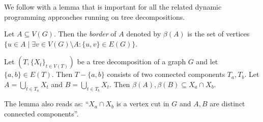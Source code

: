 We follow with a lemma that is important for all the related
dynamic programming approaches running on tree decompositions.
%
\begin{definition}
	Let \( A \subseteq V(G) \). Then the \emph{border} of \( A \) denoted by \( \beta(A) \)
	is the set of vertices
	\( \{u \in A \mid \exists v \in V(G) \setminus A : \{u, v\} \in E(G) \} \).
\end{definition}
%
\begin{lemma}
	Let \( (T, {\{X_t\}}_{t \in V ( T )}) \)
	be a tree decomposition of a graph \( G \)
	and let \( \{a, b\} \in E(T) \).
	Then \( T - \{a, b\} \) consists of two connected components \( T_a, T_b \).
	Let \( A = \bigcup_{t \in T_a} X_t \) and \( B = \bigcup_{t \in T_b} X_t \).
	Then \( \beta(A), \beta(B) \subseteq X_a \cap X_b \).
\end{lemma}
%
The lemma also reads as:
``\( X_a \cap X_b \) is a vertex cut in \( G \) and \( A, B \)
are distinct connected components''.

